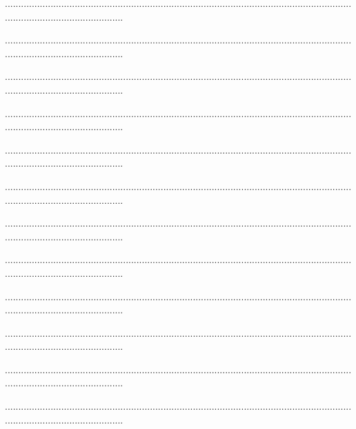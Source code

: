 \documentclass[10pt,a4paper]{exam}
\begin{document}
\vspace{10mm}

.............................................................................................................................................................................

.............................................................................................................................................................................
 
.............................................................................................................................................................................

.............................................................................................................................................................................

.............................................................................................................................................................................

.............................................................................................................................................................................
 
.............................................................................................................................................................................

.............................................................................................................................................................................
 
.............................................................................................................................................................................

.............................................................................................................................................................................
 
.............................................................................................................................................................................

.............................................................................................................................................................................
\end{document}
